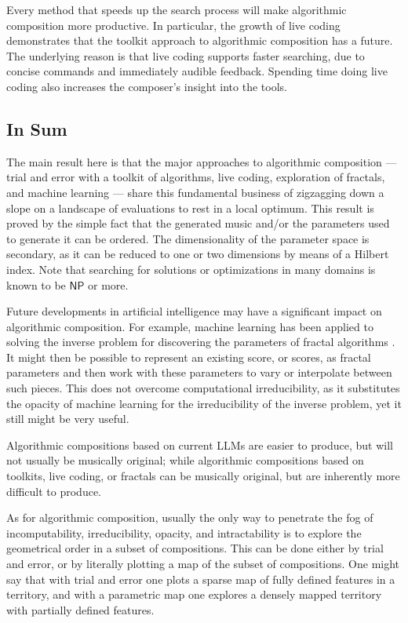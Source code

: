 \documentclass[11pt,papersize=a4]{scrartcl}
\begin{document}
Every method that speeds up the search process will make algorithmic composition more productive. In particular, the growth of live coding demonstrates that the toolkit approach to algorithmic composition has a future. The underlying reason is that live coding supports faster searching, due to concise commands and immediately audible feedback. Spending time doing live coding also increases the composer's insight into the tools.

\subsection*{In Sum}

The main result here is that the major approaches to algorithmic composition --- trial and error with a toolkit of algorithms, live coding, exploration of fractals, and machine learning --- share this fundamental business of zigzagging down a slope on a landscape of evaluations to rest in a local optimum. This result is proved by the simple fact that the generated music and/or the parameters used to generate it can be ordered. The dimensionality of the parameter space is secondary, as it can be reduced to one or two dimensions by means of a Hilbert index. Note that searching for solutions or optimizations in many domains is known to be $\mathsf{NP}$ or more.

Future developments in artificial intelligence may have a significant impact on algorithmic composition. For example, machine learning has been applied to solving the inverse problem for discovering the parameters of fractal algorithms \parencite{tu2023learning}. It might then be possible to represent an existing score, or scores, as fractal parameters and then work with these parameters to vary or interpolate between such pieces. This does not overcome computational irreducibility, as it substitutes the opacity of machine learning for the irreducibility of the inverse problem, yet it still might be very useful.

 Algorithmic compositions based on current LLMs are easier to produce, but will not usually be musically original; while algorithmic compositions based on toolkits, live coding, or fractals can be musically original, but are inherently more difficult to produce.

As for algorithmic composition, usually the only way to penetrate the fog of incomputability, irreducibility, opacity, and intractability is to explore the geometrical order in a subset of compositions. This can be done either by trial and error, or by literally plotting a map of the subset of compositions. One might say that with trial and error one plots a sparse map of fully defined features in a territory, and with a parametric map one explores a densely mapped territory with partially defined features.
\end{document}
